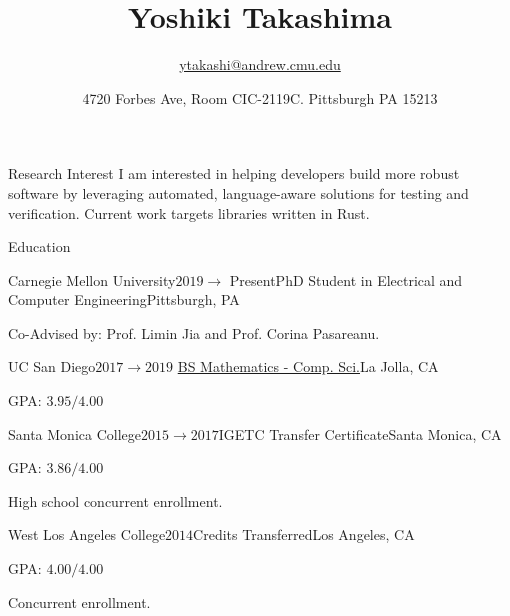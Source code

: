 \documentclass{resume} %
\title{\bf Yoshiki Takashima}
\author{\href{ytakashi@andrew.cmu.edu}{ytakashi@andrew.cmu.edu}}
\date{4720 Forbes Ave, Room CIC-2119C. Pittsburgh PA 15213}
\begin{document}
\maketitle

\begin{rSection}{Research Interest} I am interested in helping
  developers build more robust software by leveraging automated,
  language-aware solutions for testing and verification. Current work
  targets libraries written in Rust.
\end{rSection}

\begin{rSection}{Education}
  \begin{rSubsection}{Carnegie Mellon University}{$2019 \rightarrow$
      Present}{PhD Student in Electrical and Computer
      Engineering}{Pittsburgh, PA}
  \item Co-Advised by: Prof. Limin Jia and Prof. Corina Pasareanu.
  \end{rSubsection}

  \begin{rSubsection}{UC San Diego}{$2017 \rightarrow
      2019$}{
      \href{https://www.math.ucsd.edu/~handbook/undergraduate/ma30-math-computer-science-b-s/}
      {BS Mathematics - Comp. Sci.}}{La Jolla, CA}
  \item GPA: $3.95/4.00$
  \end{rSubsection}

  \begin{rSubsection}{Santa Monica College}{$2015 \rightarrow
      2017$}{IGETC Transfer Certificate}{Santa Monica, CA}
  \item GPA: $3.86/4.00$
  \item High school concurrent enrollment.
  \end{rSubsection}

  \begin{rSubsection}{West Los Angeles College}{$2014$}{Credits
      Transferred}{Los Angeles, CA}
  \item GPA: $4.00/4.00$
  \item Concurrent enrollment.
  \end{rSubsection}
\end{rSection}
\end{document}
